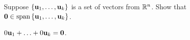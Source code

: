 \begin{enumialphparenastyle}
\begin{ex}
  Suppose $\left\{\mbox{\bf u}_{1},\ldots,\mbox{\bf u}_{k}\right\} $ is a set of
  vectors from $\mathbb{R}^{n}$. Show that
  $\vect{0}\in\sspan\set{\vect{u}_{1},\ldots,\vect{u}_{k}}$.
  \begin{sol}
    $0\mbox{\bf u}_1+\ldots+0\mbox{\bf u}_k = \mbox{\bf 0}$.
  \end{sol}
\end{ex}

\end{enumialphparenastyle}

